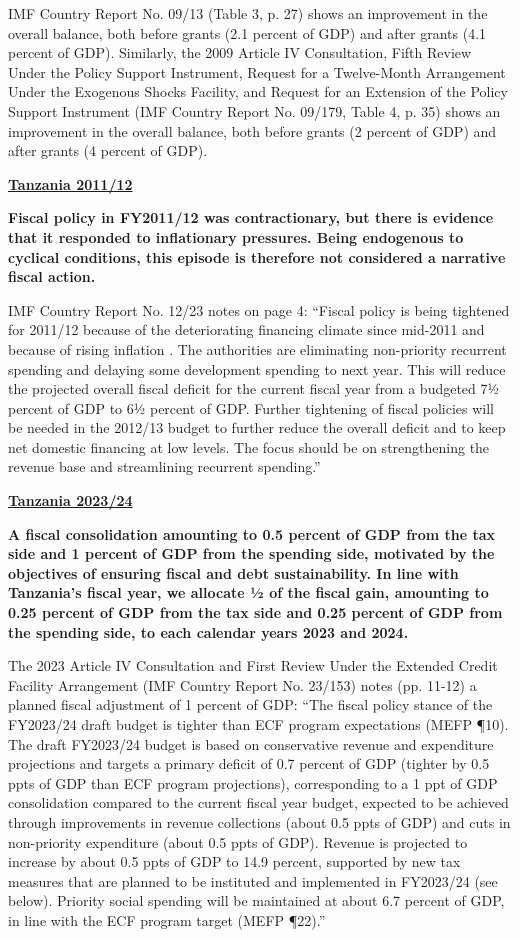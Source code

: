 IMF Country Report No. 09/13 (Table 3, p. 27) shows an improvement in the overall balance, both before grants (2.1 percent of GDP) and after grants (4.1 percent of GDP). Similarly, the 2009 Article IV Consultation, Fifth Review Under the Policy Support Instrument, Request for a Twelve-Month Arrangement Under the Exogenous Shocks Facility, and Request for an Extension of the Policy Support Instrument (IMF Country Report No. 09/179, Table 4, p. 35) shows an improvement in the overall balance, both before grants (2 percent of GDP) and after grants (4 percent of GDP).

\textbf{\underline{Tanzania 2011/12}}

\textbf{Fiscal policy in FY2011/12 was contractionary, but there is evidence that it responded to inflationary pressures. Being endogenous to cyclical conditions, this episode is therefore not considered a narrative fiscal action.} 

IMF Country Report No. 12/23 notes on page 4: “Fiscal policy is being tightened for 2011/12 because of the deteriorating financing climate since mid-2011 and because of rising inflation . The authorities are eliminating non-priority recurrent spending and delaying some development spending to next year. This will reduce the projected overall fiscal deficit for the current fiscal year from a budgeted 7½ percent of GDP to 6½ percent of GDP. Further tightening of fiscal policies will be needed in the 2012/13 budget to further reduce the overall deficit and to keep net domestic financing at low levels. The focus should be on strengthening the revenue base and streamlining recurrent spending.”

\textbf{\underline{Tanzania 2023/24}}

\textbf{A fiscal consolidation amounting to 0.5 percent of GDP from the tax side and 1 percent of GDP from the spending side, motivated by the objectives of ensuring fiscal and debt sustainability. In line with Tanzania’s fiscal year, we allocate ½ of the fiscal gain, amounting to  0.25 percent of GDP from the  tax side and  0.25 percent of GDP from the spending side, to each calendar years 2023 and 2024.}

The 2023 Article IV Consultation and First Review Under the Extended Credit Facility Arrangement (IMF Country Report No. 23/153) notes (pp. 11-12) a planned fiscal adjustment of 1 percent of GDP: “The fiscal policy stance of the FY2023/24 draft budget is tighter than ECF program expectations (MEFP ¶10). The draft FY2023/24 budget is based on conservative revenue and expenditure projections and targets a primary deficit of 0.7 percent of GDP (tighter by 0.5 ppts of  GDP than ECF program projections), corresponding to a 1 ppt of GDP consolidation compared to the current fiscal year budget, expected to be achieved through improvements in revenue collections (about 0.5 ppts of GDP) and cuts in non-priority expenditure (about 0.5 ppts of GDP). Revenue is projected to increase by about 0.5 ppts of GDP to 14.9 percent, supported by new tax measures that are planned to be instituted and implemented in FY2023/24 (see below).  Priority social spending will be maintained at about 6.7 percent of GDP, in line with the ECF program target (MEFP ¶22).”

